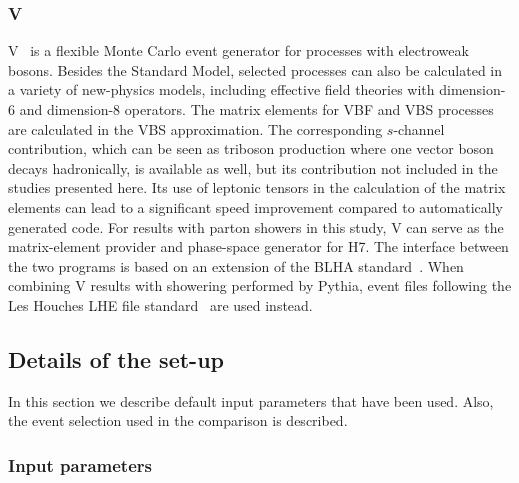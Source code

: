 \documentclass[11pt]{cernrep}
\newcommand{\Herwig}{H\protect\scalebox{0.8}{ERWIG}7\xspace}
\newcommand{\VBFNLO}{V\protect\scalebox{0.8}{BFNLO}\xspace}
\begin{document}
\subsubsection*{\protect\VBFNLO \label{vbs_VBFNLO}}
\VBFNLO~\cite{Arnold:2008rz,Arnold:2011wj,Baglio:2014uba} is a flexible
Monte Carlo event generator for processes with electroweak bosons.
Besides the Standard Model, selected processes can also be calculated in
a variety of new-physics models, including effective field theories with
dimension-6 and dimension-8 operators.
The matrix elements for VBF and VBS processes are calculated in the VBS
approximation. The corresponding $s$-channel contribution, which can be
seen as triboson production where one vector boson decays hadronically,
is available as well, but its contribution not included in the studies
presented here.
Its use of leptonic tensors in the calculation of the matrix elements
can lead to a significant speed improvement compared to automatically
generated code.
For results with parton showers in this study, \VBFNLO can serve as the
matrix-element provider and phase-space generator for \Herwig. The
interface between the two programs is based on an extension of the BLHA
standard~\cite{Binoth:2010xt,Alioli:2013nda,Andersen:2014efa}. When
combining \VBFNLO results with showering performed by Pythia, event
files following the Les Houches LHE file
standard~\cite{Boos:2001cv,Alwall:2006yp} are used instead.


\subsection{Details of the set-up \label{setup}}

In this section we describe default input parameters that have been used.
Also, the event selection used in the comparison is described.

\subsubsection*{Input parameters}
\end{document}
